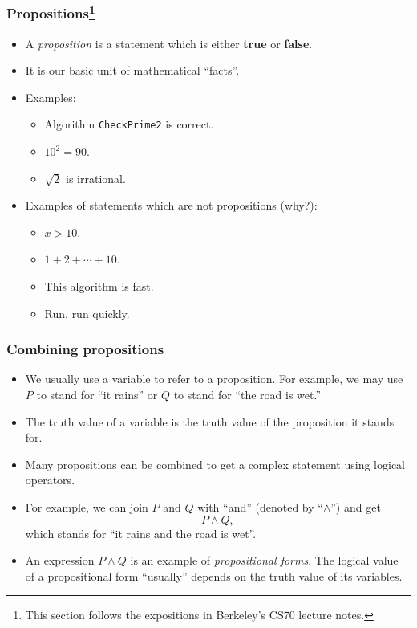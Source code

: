 \begin{frame}\frametitle{Propositions\footnote{This section follows the expositions in Berkeley's CS70 lecture notes.}}
  \begin{itemize}
  \item A {\em proposition} is a statement which is either {\bf true}
    or {\bf false}.
    \pause
  \item It is our basic unit of mathematical ``facts''.
    
  \item Examples:
    \begin{itemize}
    \item Algorithm {\tt CheckPrime2} is correct.
    \item $10^2 = 90$.
    \item $\sqrt{2}$ is irrational.
    \end{itemize}

    \pause
  \item Examples of statements which are not propositions (why?):
    \begin{itemize}
    \item $x > 10$.
    \item $1+2+\cdots+10$.
    \item This algorithm is fast.
    \item Run, run quickly.
    \end{itemize}
  \end{itemize}
\end{frame}

\begin{frame}\frametitle{Combining propositions}
  \begin{itemize}
  \item We usually use a variable to refer to a proposition.  For
    example, we may use $P$ to stand for ``it rains'' or $Q$ to stand
    for ``the road is wet.''
    \pause
  \item The truth value of a variable is the truth value of the
    proposition it stands for.
    \pause
  \item Many propositions can be combined to get a complex statement
    using logical operators.  \pause
  \item For example, we can join $P$ and $Q$ with ``and'' (denoted by
    ``$\wedge$'') and get
    \[P\wedge Q,\]
    which stands for ``it rains and the road is wet''.
    \pause
    
  \item An expression $P\wedge Q$ is an example of {\em propositional
    forms}.  The logical value of a propositional form ``usually''
    depends on the truth value of its variables.
  \end{itemize}
\end{frame}

